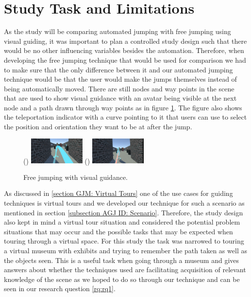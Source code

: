 \section{Study Task and Limitations}
\label{section DPUS: Study Task and Limitations}
As the study will be comparing automated jumping with free jumping using visual guiding, it was important to plan a controlled study design such that there would be no other influencing variables besides the automation. Therefore, when developing the free jumping technique that would be used for comparison we had to make sure that the only difference between it and our automated jumping technique would be that the user would make the jumps themselves instead of being automatically moved. There are still nodes and way points in the scene that are used to show visual guidance with an avatar being visible at the next node and a path drawn through way points as in figure \ref{fig:study-free-jumping}. The figure also shows the teleportation indicator with a curve pointing to it that users can use to select the position and orientation they want to be at after the jump.

\begin{figure}[]
	()
	\includegraphics[width=0.25\textwidth]{images/free-jumping.pdf}
	()
	\includegraphics[width=0.25\textwidth]{images/automated-jumping.pdf}
	\caption{Free jumping with visual guidance.}
	\label{fig:study-free-jumping}
\end{figure}

As discussed in \ref{section GJM: Virtual Tours} one of the use cases for guiding techniques is virtual tours and we developed our technique for such a scenario as mentioned in section \ref{subsection AGJ ID: Scenario}. Therefore, the study design also kept in mind a virtual tour situation and considered the potential problem situations that may occur and the possible tasks that may be expected when touring through a virtual space. For this study the task was narrowed to touring a virtual museum with exhibits and trying to remember the path taken as well as the objects seen. This is a useful task when going through a museum and gives answers about whether the techniques used are facilitating acquisition of relevant knowledge of the scene as we hoped to do so through our technique and can be seen in our research question \cref{rq:rq1}.


